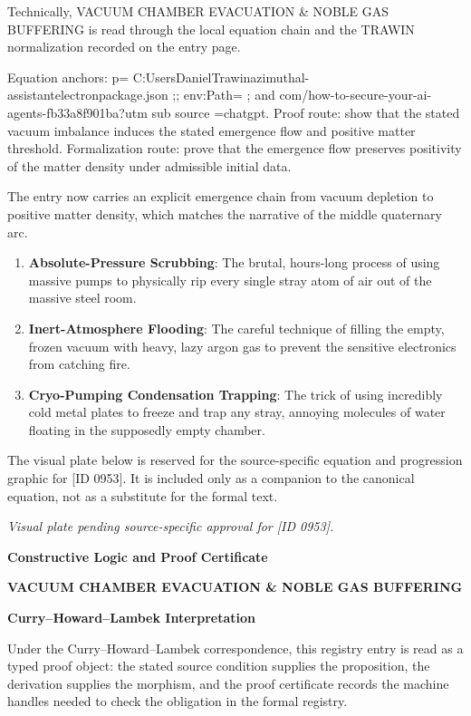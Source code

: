 Technically, VACUUM CHAMBER EVACUATION \& NOBLE GAS BUFFERING is read through the local equation chain and the TRAWIN normalization recorded on the entry page.

Equation anchors: p= C:UsersDanielTrawinazimuthal-assistantelectronpackage.json ;; env:Path= ; and com/how-to-secure-your-ai-agents-fb33a8f901ba?utm sub source =chatgpt. Proof route: show that the stated vacuum imbalance induces the stated emergence flow and positive matter threshold. Formalization route: prove that the emergence flow preserves positivity of the matter density under admissible initial data.

The entry now carries an explicit emergence chain from vacuum depletion to positive matter density, which matches the narrative of the middle quaternary arc.
\endgroup

\begin{enumerate}[leftmargin=1.6em,itemsep=6pt,topsep=4pt]
\item \textbf{Absolute-Pressure Scrubbing}: The brutal, hours-long process of using massive pumps to physically rip every single stray atom of air out of the massive steel room.
\item \textbf{Inert-Atmosphere Flooding}: The careful technique of filling the empty, frozen vacuum with heavy, lazy argon gas to prevent the sensitive electronics from catching fire.
\item \textbf{Cryo-Pumping Condensation Trapping}: The trick of using incredibly cold metal plates to freeze and trap any stray, annoying molecules of water floating in the supposedly empty chamber.
\end{enumerate}

\begingroup\footnotesize\sloppy
The visual plate below is reserved for the source-specific equation and progression graphic for [ID 0953]. It is included only as a companion to the canonical equation, not as a substitute for the formal text.
\par\endgroup
\begingroup\footnotesize\itshape
Visual plate pending source-specific approval for [ID 0953].
\par\endgroup

\clearpage
\begingroup\tzpsupportsetup
\noindent\textbf{\fontsize{10.8pt}{12.8pt}\selectfont [ID 0953] Constructive Logic and Proof Certificate}\par
\noindent\textbf{\fontsize{10pt}{12pt}\selectfont VACUUM CHAMBER EVACUATION \& NOBLE GAS BUFFERING}\par
\vspace{0.45em}
\begingroup
\footnotesize
\setlength{\parskip}{0.22em}
\setlength{\parindent}{0pt}
\noindent\textbf{Curry--Howard--Lambek Interpretation}\par
Under the Curry--Howard--Lambek correspondence, this registry entry is read as a typed proof
object: the stated source condition supplies the proposition, the derivation supplies the
morphism, and the proof certificate records the machine handles needed to check the obligation
in the formal registry.

